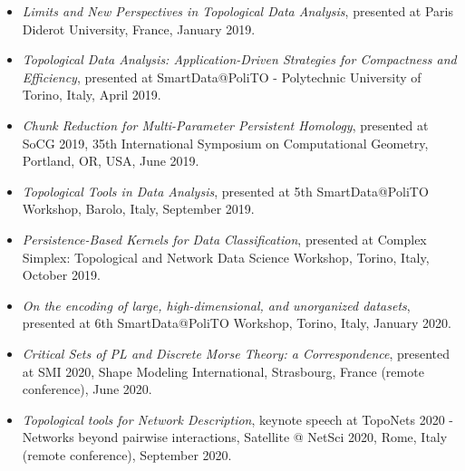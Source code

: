 \documentclass[11pt]{article}
\begin{document}
\begin{itemize}
\item {\em Limits and New Perspectives in Topological Data Analysis}, presented at Paris Diderot University, France, January 2019.

\item {\em Topological Data Analysis: Application-Driven Strategies for Compactness and Efficiency}, presented at SmartData@PoliTO - Polytechnic University of Torino, Italy, April 2019.

\item {\em Chunk Reduction for Multi-Parameter Persistent Homology}, presented at SoCG 2019, 35th International Symposium on Computational Geometry, Portland, OR, USA, June 2019.

\item {\em Topological Tools in Data Analysis}, presented at 5th SmartData@PoliTO Workshop, Barolo, Italy, September 2019.

\item {\em Persistence-Based Kernels for Data Classification}, presented at Complex Simplex: Topological and Network Data Science Workshop, Torino, Italy, October 2019.

\item {\em On the encoding of large, high-dimensional, and unorganized datasets}, presented at 6th SmartData@PoliTO Workshop, Torino, Italy, January 2020.


\item {\em Critical Sets of PL and Discrete Morse Theory: a Correspondence}, presented at SMI 2020, Shape Modeling International, Strasbourg, France (remote conference), June 2020.


\item {\em Topological tools for Network Description}, keynote speech at TopoNets 2020 - Networks beyond pairwise interactions, Satellite @ NetSci 2020, Rome, Italy (remote conference), September 2020.



\end{itemize}
\end{document}
